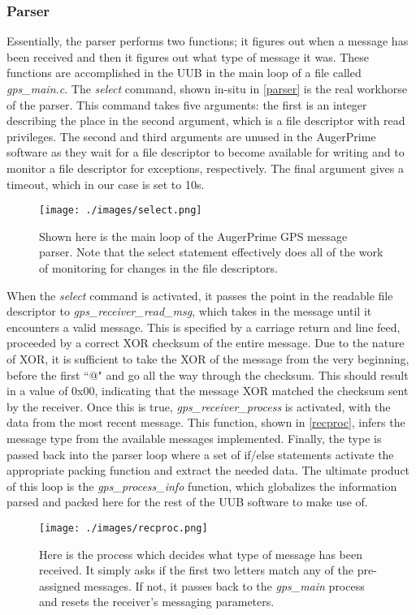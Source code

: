 \subsubsection{Parser}
Essentially, the parser performs two functions; it figures out when a message has been received and then it figures out what type of message it was. These functions are accomplished in the UUB in the main loop of a file called \textit{gps\_main.c}. The \textit{select} command, shown in-situ in \autoref{parser} is the real workhorse of the parser. This command takes five arguments: the first is an integer describing the place in the second argument, which is a file descriptor with read privileges. The second and third arguments are unused in the AugerPrime software as they wait for a file descriptor to become available for writing and to monitor a file descriptor for exceptions, respectively. The final argument gives a timeout, which in our case is set to 10s. 
\begin{figure}[h!]
\centering
\texttt{[image: ./images/select.png]}
\caption[GPS Parser Loop]{Shown here is the main loop of the AugerPrime GPS message parser. Note that the select statement effectively does all of the work of monitoring for changes in the file descriptors.}
\label{parser}
\end{figure}
When the \textit{select} command is activated, it passes the point in the readable file descriptor to \textit{gps\_receiver\_read\_msg}, which takes in the message until it encounters a valid message. This is specified by a carriage return and line feed, proceeded by a correct XOR checksum of the entire message. Due to the nature of XOR, it is sufficient to take the XOR of the message from the very beginning, before the first ``@" and go all the way through the checksum. This should result in a value of 0x00, indicating that the message XOR matched the checksum sent by the receiver. Once this is true, \textit{gps\_receiver\_process} is activated, with the data from the most recent message. This function, shown in \autoref{recproc}, infers the message type from the available messages implemented. Finally, the type is passed back into the parser loop where a set of if/else statements activate the appropriate packing function and extract the needed data. The ultimate product of this loop is the \textit{gps\_process\_info} function, which globalizes the information parsed and packed here for the rest of the UUB software to make use of.
\begin{figure}[h!]
\centering
\texttt{[image: ./images/recproc.png]}
\caption[GPS Receiver Process]{Here is the process which decides what type of message has been received. It simply asks if the first two letters match any of the pre-assigned messages. If not, it passes back to the \textit{gps\_main} process and resets the receiver's messaging parameters.}
\label{recproc}
\end{figure}


